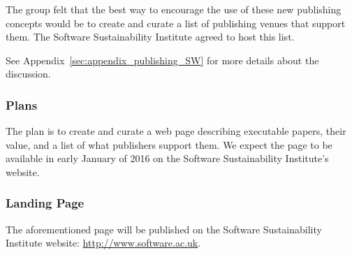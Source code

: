The group felt that the best way to encourage the use of these new publishing
concepts would be to create and curate a list of publishing venues that
support them. The Software Sustainability Institute agreed to host this list.

See Appendix~\ref{sec:appendix_publishing_SW} for more details about the
discussion.

\subsubsection{Plans}

The plan is to create and curate a web page describing executable papers, their value, and
a list of what publishers support them. We expect the page to be available in
early January of 2016 on the Software Sustainability Institute's website.

\subsubsection{Landing Page}

The aforementioned page will be published on the Software Sustainability
Institute website: \url{http://www.software.ac.uk}.
